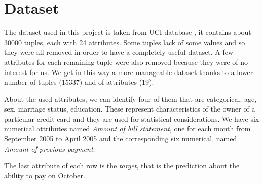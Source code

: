 \documentclass{vldb}
\begin{document}
\section{Dataset}
The dataset used in this project is taken from UCI database \cite{UCI:2016}, it contains about 30000 tuples, each with 24 attributes. 
Some tuples lack of some values and so they were all removed in order to have a completely useful dataset. A few attributes for each remaining tuple were also removed because they were of no interest for us. We get in this way a more manageable dataset thanks to a lower number of tuples (15337) and of attributes (19).

About the used attributes, we can identify four of them that are categorical: age, sex, marriage status, education. These represent characteristics of the owner of a particular credit card and they are used for statistical considerations. We have six numerical attributes named \textit{Amount of bill statement}, one for each month from September 2005 to April 2005 and the corresponding six numerical, named \textit{Amount of previous payment}.

The last attribute of each row is the \textit{target}, that is the prediction about the ability to pay on October.













\end{document}
